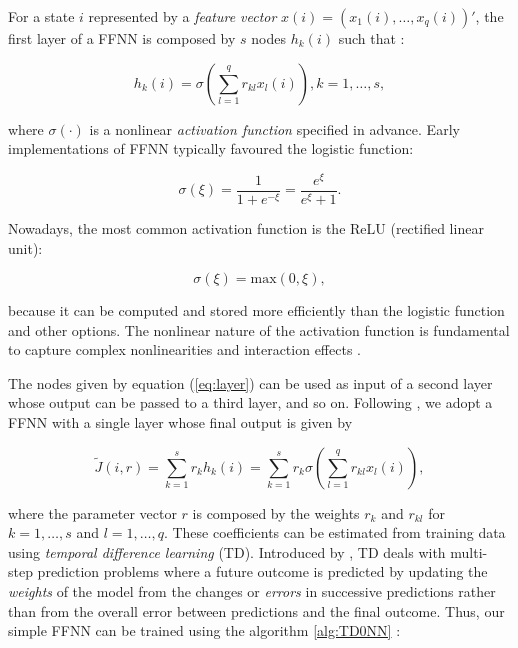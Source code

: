For a state $i$ represented by a \emph{feature vector} $ x(i) = (x_1(i), \dots, x_q(i))'$, the first layer of a FFNN is composed by $s$ nodes $h_k(i)$ such that \citep[chapter 3]{Bertsekas1996}:

\begin{equation}
\label{eq:layer}
h_k(i) = \sigma \left(\sum_{l=1}^{q}{r_{kl}} x_l(i) \right), k = 1, \dots, s,
\end{equation}

\noindent where $\sigma(\cdot)$ is a nonlinear \emph{activation function} specified in advance. Early implementations of FFNN typically favoured the logistic function:

\begin{equation}
\label{eq:logistic}
\sigma(\xi) = \frac{1}{1 + e^{-\xi}} = \frac{e^{\xi}}{e^{\xi}+1}.
\end{equation}

\noindent Nowadays, the most common activation function is the ReLU (rectified linear unit):

\begin{equation}
\label{eq:relu}
\sigma(\xi) = \textrm{max} (0, \xi),
\end{equation}

\noindent because it can be computed and stored more efficiently than the logistic function and other options. The nonlinear nature of the activation function is fundamental to capture complex nonlinearities and interaction effects \citep[chapter 10]{James2021}.

The nodes given by equation (\ref{eq:layer}) can be used as input of a second layer whose output can be passed to a third layer, and so on. Following \citet[chapter 3]{Bertsekas1996}, we adopt a FFNN with a single layer whose final output is given by

\begin{equation}
\label{eq:output}
\tilde{J}(i,r) = \sum_{k=1}^{s}{r_k h_k(i)} = \sum_{k=1}^{s}{r_k \sigma \left(\sum_{l=1}^{q}{r_{kl}} x_l(i) \right)},
\end{equation}

\noindent where the parameter vector $r$ is composed by the weights $r_k$ and $r_{kl}$ for $k = 1, \dots, s$ and $l = 1, \dots, q$. These coefficients can be estimated from training data using \emph{temporal difference learning} (TD). Introduced by \citet{Sutton1988}, TD deals with multi-step prediction problems where a future outcome is predicted by updating the \emph{weights} of the model from the changes or \emph{errors} in successive predictions rather than from the overall error between predictions and the final outcome. Thus, our simple FFNN can be trained using the algorithm \ref{alg:TD0NN} \citep[section 2.2]{Szepesvari2010} \citep[section 6.2]{Bertsekas2011}:

